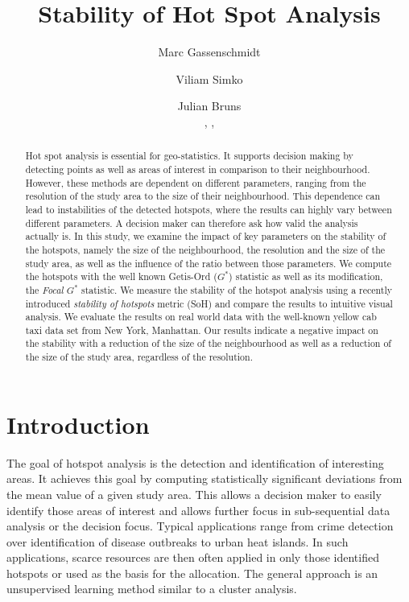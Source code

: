\documentclass{itatnew}
\begin{document}
\title{Stability of Hot Spot Analysis}

\author{
  Marc Gassenschmidt \and
  Viliam Simko  \and
  Julian Bruns
  \\
  ,
  ,
}

  
\maketitle              %



\begin{abstract}
Hot spot analysis is essential for geo-statistics.
It supports decision making by detecting points
as well as areas of interest in comparison to their
neighbourhood. However, these methods are dependent
on different parameters, ranging from the resolution
of the study area to the size of their neighbourhood.
This dependence can lead to instabilities of the detected
hotspots, where the results can highly vary between
different parameters. A decision maker can therefore ask
how valid the analysis actually is.
%
In this study, we examine the impact of key parameters
on the stability of the hotspots, namely the size of
the neighbourhood, the resolution and the size of the
study area, as well as the influence of the ratio between
those parameters.
%
We compute the hotspots with the well known Getis-Ord ($G^*$)
statistic as well as its modification, the \emph{Focal $G^*$} statistic.
We measure the stability of the hotspot analysis using
a recently introduced \emph{stability of hotspots} metric (SoH)
and compare the results to intuitive visual analysis.
%
We evaluate the results on real world data with the well-known
yellow cab taxi data set from New York, Manhattan.
Our results indicate a negative impact on the stability with
a reduction of the size of the neighbourhood as well as
a reduction of the size of the study area, regardless of
the resolution.
\end{abstract}


\section{Introduction}
The goal of hotspot analysis is the detection and identification of interesting areas. It achieves this goal by computing statistically significant deviations from the mean value of a given study area. This allows a decision maker to easily identify those areas of interest and allows further focus in sub-sequential data analysis or the decision focus. Typical applications range from crime detection over identification of disease outbreaks to urban heat islands. In such applications, scarce resources are then often applied in only those identified hotspots or used as the basis for the allocation. The general approach is an unsupervised learning method similar to a cluster analysis. 
\end{document}
